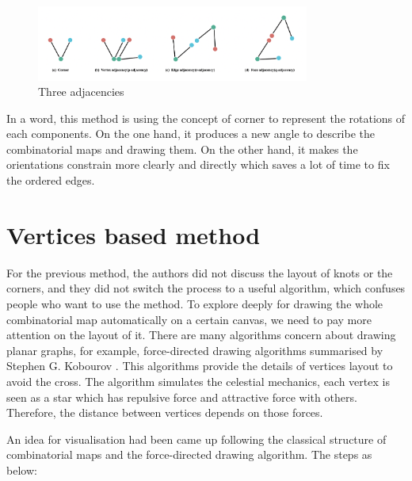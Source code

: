     \begin{figure}[htb]
      \centering
      \includegraphics[width=0.8\textwidth]{../../image/adjacencies.png}
      \caption{Three adjacencies}
      \label{fig:figures:adjacencies}
    \end{figure}

In a word, this method is using the concept of corner to represent the rotations of each components. On the one hand, it produces a new angle to describe the combinatorial maps and drawing them. On the other hand, it makes the orientations constrain more clearly and directly which saves a lot of time to fix the ordered edges. 

\section{Vertices based method}

For the previous method, the authors did not discuss the layout of knots or the corners, and they did not switch the process to a useful algorithm, which confuses people who want to use the method. To explore deeply for drawing the whole combinatorial map automatically on a certain canvas, we need to pay more attention on the layout of it. There are many algorithms concern about drawing planar graphs, for example, force-directed drawing algorithms summarised by Stephen G. Kobourov \cite{kobourovg}. This algorithms provide the details of vertices layout to avoid the cross. The algorithm simulates the celestial mechanics, each vertex is seen as a star which has repulsive force and attractive force with others. Therefore, the distance between vertices depends on those forces.

An idea\cite{tingyu2019drawer} for visualisation had been came up following the classical structure of combinatorial maps and the force-directed drawing algorithm. The steps as below:


